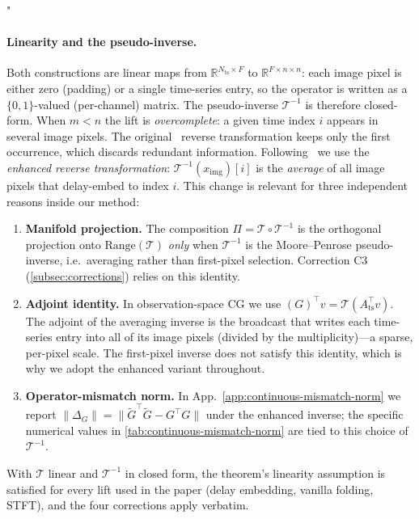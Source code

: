 "\documentclass{article}
\theoremstyle{plain}
\theoremstyle{definition}
\theoremstyle{remark}
\newcommand{\tsimg}{\mathcal{T}}
\newcommand{\imgts}{\mathcal{T}^{-1}}
\newcommand{\Nts}{N_{\mathrm{ts}}}
\newcommand{\Ats}{A_{\mathrm{ts}}}
\newcommand{\ximg}{x_{\mathrm{img}}}
\begin{document}
\paragraph{Linearity and the pseudo-inverse.}
Both constructions are linear maps from $\mathbb{R}^{\Nts \times F}$ to $\mathbb{R}^{F \times n \times n}$: each image pixel is either zero (padding) or a single time-series entry, so the operator is written as a $\{0,1\}$-valued (per-channel) matrix. The pseudo-inverse $\imgts$ is therefore closed-form. When $m < n$ the lift is \emph{overcomplete}: a given time index $i$ appears in several image pixels. The original~\citep{takens2006detecting} reverse transformation keeps only the first occurrence, which discards redundant information. Following~\citet{fadlon2025imageni2r} we use the \emph{enhanced reverse transformation}: $\imgts(\ximg)[i]$ is the \emph{average} of all image pixels that delay-embed to index $i$. This change is relevant for three independent reasons inside our method:

\begin{enumerate}
\setlength{\itemsep}{0pt}
\item \textbf{Manifold projection.} The composition $\Pi = \tsimg \circ \imgts$ is the orthogonal projection onto $\mathrm{Range}(\tsimg)$ \emph{only} when $\imgts$ is the Moore--Penrose pseudo-inverse, i.e.\ averaging rather than first-pixel selection. Correction C3 (\cref{subsec:corrections}) relies on this identity.
\item \textbf{Adjoint identity.} In observation-space CG we use $(G)^\top v = \tsimg(\Ats^\top v)$. The adjoint of the averaging inverse is the broadcast that writes each time-series entry into all of its image pixels (divided by the multiplicity)---a sparse, per-pixel scale. The first-pixel inverse does not satisfy this identity, which is why we adopt the enhanced variant throughout.
\item \textbf{Operator-mismatch norm.} In App.~\ref{app:continuous-mismatch-norm} we report $\|\Delta_G\| = \|\tilde{G}^\top \tilde{G} - G^\top G\|$ under the enhanced inverse; the specific numerical values in \cref{tab:continuous-mismatch-norm} are tied to this choice of $\imgts$.
\end{enumerate}

With $\tsimg$ linear and $\imgts$ in closed form, the theorem's linearity assumption is satisfied for every lift used in the paper (delay embedding, vanilla folding, STFT), and the four corrections apply verbatim.
\end{document}
